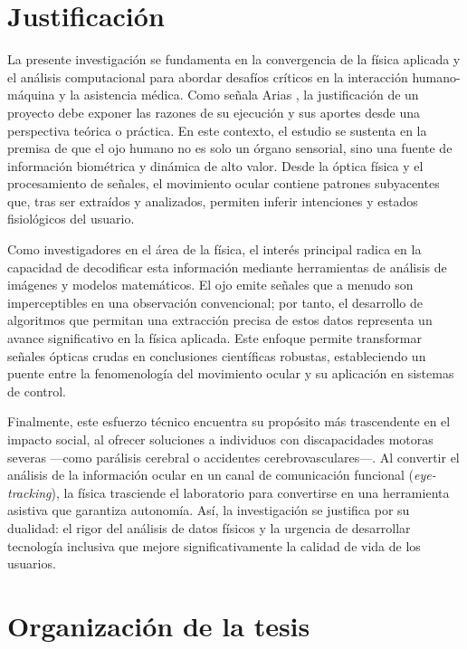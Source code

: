 \section{Justificación}

La presente investigación se fundamenta en la convergencia de la física aplicada y el análisis computacional para abordar desafíos críticos en la interacción humano-máquina y la asistencia médica. Como señala Arias \cite{arias2010}, la justificación de un proyecto debe exponer las razones de su ejecución y sus aportes desde una perspectiva teórica o práctica. En este contexto, el estudio se sustenta en la premisa de que el ojo humano no es solo un órgano sensorial, sino una fuente de información biométrica y dinámica de alto valor. Desde la óptica física y el procesamiento de señales, el movimiento ocular contiene patrones subyacentes que, tras ser extraídos y analizados, permiten inferir intenciones y estados fisiológicos del usuario.

Como investigadores en el área de la física, el interés principal radica en la capacidad de decodificar esta información mediante herramientas de análisis de imágenes y modelos matemáticos. El ojo emite señales que a menudo son imperceptibles en una observación convencional; por tanto, el desarrollo de algoritmos que permitan una extracción precisa de estos datos representa un avance significativo en la física aplicada. Este enfoque permite transformar señales ópticas crudas en conclusiones científicas robustas, estableciendo un puente entre la fenomenología del movimiento ocular y su aplicación en sistemas de control.

Finalmente, este esfuerzo técnico encuentra su propósito más trascendente en el impacto social, al ofrecer soluciones a individuos con discapacidades motoras severas —como parálisis cerebral o accidentes cerebrovasculares—. Al convertir el análisis de la información ocular en un canal de comunicación funcional (\textit{eye-tracking}), la física trasciende el laboratorio para convertirse en una herramienta asistiva que garantiza autonomía. Así, la investigación se justifica por su dualidad: el rigor del análisis de datos físicos y la urgencia de desarrollar tecnología inclusiva que mejore significativamente la calidad de vida de los usuarios.

\section{Organización de la tesis}

